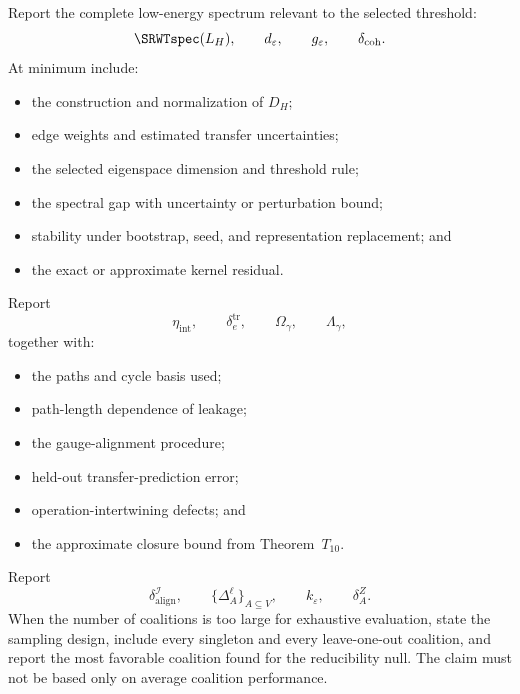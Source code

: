 
Report the complete low-energy spectrum relevant to the selected threshold:
\[
\SRWTspec(L_H),
\qquad
 d_\varepsilon,
\qquad
 g_\varepsilon,
\qquad
 \delta_{\mathrm{coh}}.
\]
At minimum include:
\begin{itemize}
\item the construction and normalization of \(D_H\);
\item edge weights and estimated transfer uncertainties;
\item the selected eigenspace dimension and threshold rule;
\item the spectral gap with uncertainty or perturbation bound;
\item stability under bootstrap, seed, and representation replacement; and
\item the exact or approximate kernel residual.
\end{itemize}


Report
\[
\eta_{\mathrm{int}},
\qquad
\delta_e^{\mathrm{tr}},
\qquad
\Omega_\gamma,
\qquad
\Lambda_\gamma,
\]
together with:
\begin{itemize}
\item the paths and cycle basis used;
\item path-length dependence of leakage;
\item the gauge-alignment procedure;
\item held-out transfer-prediction error;
\item operation-intertwining defects; and
\item the approximate closure bound from Theorem~\(T_{10}\).
\end{itemize}


Report
\[
\delta_{\mathrm{align}}^{\mathcal I},
\qquad
\{\Delta_A^\ell\}_{A\subseteq V},
\qquad
 k_\varepsilon,
\qquad
\delta_A^Z.
\]
When the number of coalitions is too large for exhaustive evaluation, state the
sampling design, include every singleton and every leave-one-out coalition,
and report the most favorable coalition found for the reducibility null. The
claim must not be based only on average coalition performance.


